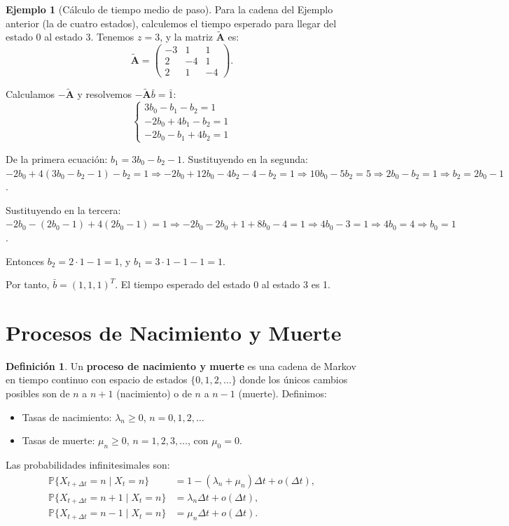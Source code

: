 \documentclass{article}
\theoremstyle{plain}
\theoremstyle{definition}
\newtheorem{Definicion}[Teorema]{Definici\'on}
\newtheorem{Ejemplo}[Teorema]{Ejemplo}
\newcommand{\Prob}{\mathbb{P}}
\newcommand{\A}{\mathbf{A}}
\begin{document}
\begin{Ejemplo}[C\'alculo de tiempo medio de paso]
  Para la cadena del Ejemplo anterior (la de cuatro estados), calculemos el tiempo esperado para llegar del estado 0 al estado 3. Tenemos $z = 3$, y la matriz $\tilde{\A}$ es:
  \[ \tilde{\A} = \begin{pmatrix}
    -3 & 1 & 1 \\
    2 & -4 & 1 \\
    2 & 1 & -4
  \end{pmatrix}. \]

  Calculamos $-\tilde{\A}$ y resolvemos $-\tilde{\A} \bar{b} = \bar{1}$:
  \[ \begin{cases}
    3b_0 - b_1 - b_2 = 1 \\
    -2b_0 + 4b_1 - b_2 = 1 \\
    -2b_0 - b_1 + 4b_2 = 1
  \end{cases} \]

  De la primera ecuaci\'on: $b_1 = 3b_0 - b_2 - 1$.
  Sustituyendo en la segunda: $-2b_0 + 4(3b_0 - b_2 - 1) - b_2 = 1 \Rightarrow -2b_0 + 12b_0 - 4b_2 - 4 - b_2 = 1 \Rightarrow 10b_0 - 5b_2 = 5 \Rightarrow 2b_0 - b_2 = 1 \Rightarrow b_2 = 2b_0 - 1$.

  Sustituyendo en la tercera: $-2b_0 - (2b_0 - 1) + 4(2b_0 - 1) = 1 \Rightarrow -2b_0 - 2b_0 + 1 + 8b_0 - 4 = 1 \Rightarrow 4b_0 - 3 = 1 \Rightarrow 4b_0 = 4 \Rightarrow b_0 = 1$.

  Entonces $b_2 = 2\cdot 1 - 1 = 1$, y $b_1 = 3\cdot 1 - 1 - 1 = 1$.

  Por tanto, $\bar{b} = (1,1,1)^T$. El tiempo esperado del estado 0 al estado 3 es 1.
\end{Ejemplo}

\section{Procesos de Nacimiento y Muerte}

\begin{Definicion}
  Un \textbf{proceso de nacimiento y muerte} es una cadena de Markov en tiempo continuo con espacio de estados $\{0,1,2,\ldots\}$ donde los \'unicos cambios posibles son de $n$ a $n+1$ (nacimiento) o de $n$ a $n-1$ (muerte). Definimos:
  \begin{itemize}
    \item Tasas de nacimiento: $\lambda_n \geq 0$, $n = 0,1,2,\ldots$
    \item Tasas de muerte: $\mu_n \geq 0$, $n = 1,2,3,\ldots$, con $\mu_0 = 0$.
  \end{itemize}
  Las probabilidades infinitesimales son:
  \begin{align*}
    \Prob\{X_{t+\Delta t} = n \mid X_t = n\} &= 1 - (\lambda_n + \mu_n)\Delta t + o(\Delta t),\\
    \Prob\{X_{t+\Delta t} = n+1 \mid X_t = n\} &= \lambda_n \Delta t + o(\Delta t),\\
    \Prob\{X_{t+\Delta t} = n-1 \mid X_t = n\} &= \mu_n \Delta t + o(\Delta t).
  \end{align*}
\end{Definicion}
\end{document}
